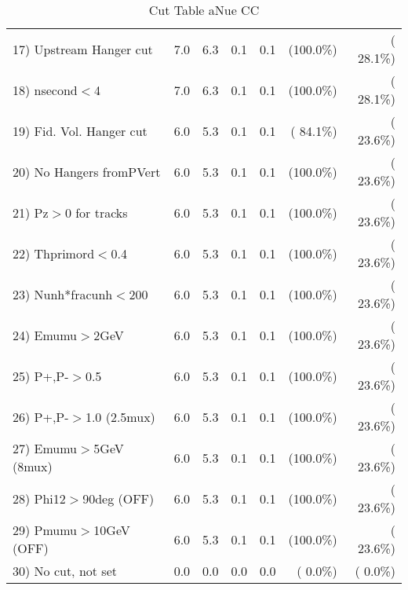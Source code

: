 \begin{table}[h!]
\begin{tabular}{||l||r|r|r|r|r|r||}
 17) Upstream Hanger cut  &          7.0 &          6.3 &          0.1 &          0.1 & (100.0\%) & ( 28.1\%) \\
 18) nsecond$<$4          &          7.0 &          6.3 &          0.1 &          0.1 & (100.0\%) & ( 28.1\%) \\
 19) Fid. Vol. Hanger cut &          6.0 &          5.3 &          0.1 &          0.1 & ( 84.1\%) & ( 23.6\%) \\
 20) No Hangers fromPVert &          6.0 &          5.3 &          0.1 &          0.1 & (100.0\%) & ( 23.6\%) \\
 21) Pz$>$0 for tracks    &          6.0 &          5.3 &          0.1 &          0.1 & (100.0\%) & ( 23.6\%) \\
 22) Thprimord$<$0.4      &          6.0 &          5.3 &          0.1 &          0.1 & (100.0\%) & ( 23.6\%) \\
 23) Nunh*fracunh$<$200   &          6.0 &          5.3 &          0.1 &          0.1 & (100.0\%) & ( 23.6\%) \\
 24) Emumu$>$2GeV         &          6.0 &          5.3 &          0.1 &          0.1 & (100.0\%) & ( 23.6\%) \\
 25) P+,P-$>$0.5          &          6.0 &          5.3 &          0.1 &          0.1 & (100.0\%) & ( 23.6\%) \\
 26) P+,P-$>$1.0 (2.5mux) &          6.0 &          5.3 &          0.1 &          0.1 & (100.0\%) & ( 23.6\%) \\
 27) Emumu$>$5GeV  (8mux) &          6.0 &          5.3 &          0.1 &          0.1 & (100.0\%) & ( 23.6\%) \\
 28) Phi12$>$90deg  (OFF) &          6.0 &          5.3 &          0.1 &          0.1 & (100.0\%) & ( 23.6\%) \\
 29) Pmumu$>$10GeV  (OFF) &          6.0 &          5.3 &          0.1 &          0.1 & (100.0\%) & ( 23.6\%) \\
 30) No cut, not set      &          0.0 &          0.0 &          0.0 &          0.0 & (  0.0\%) & (  0.0\%) \\
 \hline
 \hline
 \end{tabular}
 \caption{Cut Table  aNue CC  }
 \label{tab-cutheavy_neutrino_3.000}
 \end{table}

